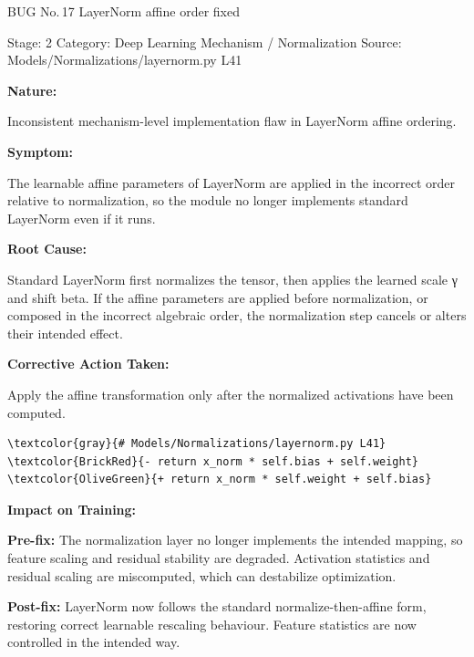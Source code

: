 \documentclass[10pt]{article}
\newcommand{\FieldLabel}[1]{%
 {\bfseries #1:}\par
}
\begin{document}
\begin{bugbox}{BUG No.\,17 \quad LayerNorm affine order fixed}
{\color{MetaGray}\small Stage: 2 \;\textbar\; Category: Deep Learning Mechanism / Normalization \;\textbar\; Source: Models/Normalizations/layernorm.py L41\par}
\vspace{0.22em}
\FieldLabel{Nature}
Inconsistent mechanism-level implementation flaw in LayerNorm affine ordering.
\par
\vspace{0.35em}
\FieldLabel{Symptom}
The learnable affine parameters of LayerNorm are applied in the incorrect order relative to normalization, so the module no longer implements standard LayerNorm even if it runs.
\par
\vspace{0.35em}
\FieldLabel{Root Cause}
Standard LayerNorm first normalizes the tensor, then applies the learned scale γ and shift beta. If the affine parameters are applied before normalization, or composed in the incorrect algebraic order, the normalization step cancels or alters their intended effect.
\par
\vspace{0.35em}
\FieldLabel{Corrective Action Taken}
Apply the affine transformation only after the normalized activations have been computed.
\par
\vspace{0.35em}
\begin{Verbatim}[commandchars=\\\{\},fontsize=\footnotesize,breaklines=true,breaksymbol={},frame=leftline,framerule=2pt,rulecolor=\color{gray!40},xleftmargin=6pt,formatcom=\singlespacing]
\textcolor{gray}{# Models/Normalizations/layernorm.py L41}
\textcolor{BrickRed}{- return x_norm * self.bias + self.weight}
\textcolor{OliveGreen}{+ return x_norm * self.weight + self.bias}
\end{Verbatim}
\vspace{0.22em}
\FieldLabel{Impact on Training}
\textbf{Pre-fix:} The normalization layer no longer implements the intended mapping, so feature scaling and residual stability are degraded. Activation statistics and residual scaling are miscomputed, which can destabilize optimization. \par\smallskip
\textbf{Post-fix:} LayerNorm now follows the standard normalize-then-affine form, restoring correct learnable rescaling behaviour. Feature statistics are now controlled in the intended way. 
\par
\vspace{0.35em}
\end{bugbox}
\end{document}
